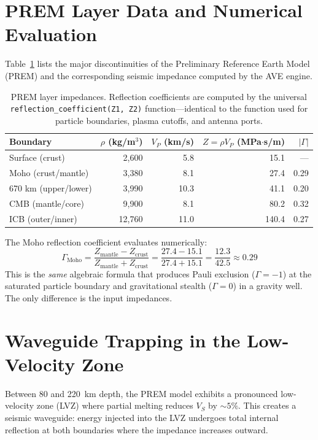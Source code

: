 \section{PREM Layer Data and Numerical Evaluation}

Table~\ref{tab:prem_layers} lists the major discontinuities of the Preliminary Reference Earth Model (PREM) and the corresponding seismic impedance computed by the AVE engine.

\begin{table}[H]
\centering
\caption{PREM layer impedances. Reflection coefficients are computed by the universal \texttt{reflection\_coefficient(Z1, Z2)} function---identical to the function used for particle boundaries, plasma cutoffs, and antenna ports.}
\label{tab:prem_layers}
\small
\begin{tabular}{@{}l r r r r@{}}
\toprule
\textbf{Boundary} & $\rho$ (kg/m$^3$) & $V_P$ (km/s) & $Z = \rho V_P$ (MPa$\cdot$s/m) & $|\Gamma|$ \\
\midrule
Surface (crust)       & 2,600  & 5.8   & 15.1 & --- \\
Moho (crust/mantle)   & 3,380  & 8.1   & 27.4 & 0.29 \\
670 km (upper/lower)  & 3,990  & 10.3  & 41.1 & 0.20 \\
CMB (mantle/core)     & 9,900  & 8.1   & 80.2 & 0.32 \\
ICB (outer/inner)     & 12,760 & 11.0  & 140.4 & 0.27 \\
\bottomrule
\end{tabular}
\end{table}

\noindent The Moho reflection coefficient evaluates numerically:
\begin{equation}
    \Gamma_{\text{Moho}} = \frac{Z_{\text{mantle}} - Z_{\text{crust}}}{Z_{\text{mantle}} + Z_{\text{crust}}} = \frac{27.4 - 15.1}{27.4 + 15.1} = \frac{12.3}{42.5} \approx 0.29
\end{equation}
This is the \textit{same} algebraic formula that produces Pauli exclusion ($\Gamma = -1$) at the saturated particle boundary and gravitational stealth ($\Gamma = 0$) in a gravity well. The only difference is the input impedances.

\section{Waveguide Trapping in the Low-Velocity Zone}

Between 80 and 220~km depth, the PREM model exhibits a pronounced low-velocity zone (LVZ) where partial melting reduces $V_S$ by $\sim 5\%$. This creates a seismic waveguide: energy injected into the LVZ undergoes total internal reflection at both boundaries where the impedance increases outward.

